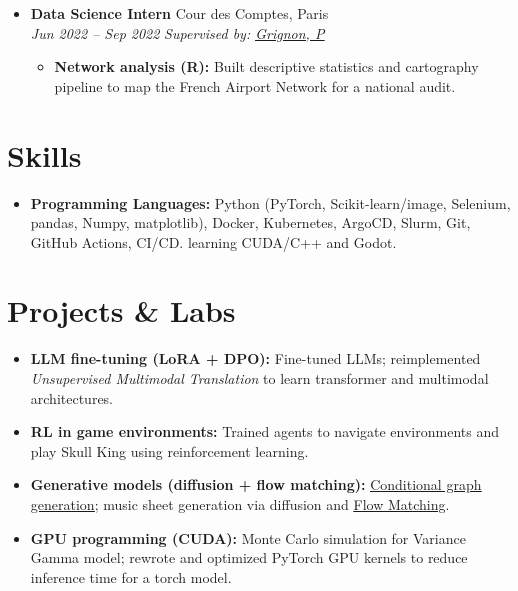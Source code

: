 \documentclass[letterpaper,11pt,twocolumn]{article}
\newcommand{\resumeItem}[1]{\item \small{#1}}
\newcommand{\resumeSubheading}[4]{
	\vspace{-2pt}\item \textbf{#1} \hfill #2 \\
	\textit{\small #3} \hfill \textit{\small #4} 
	\vspace{-7pt}
}
\newcommand{\resumeItemListStart}{\begin{itemize}[leftmargin=*]}
\newcommand{\resumeItemListEnd}{\end{itemize}\vspace{-5pt}}
\begin{document}
\begin{itemize}[leftmargin=*]
	\resumeItemListStart
	\resumeItem{\textbf{3D liver vessel segmentation (deep learning):} Implemented topology-preserving losses to improve segmentation accuracy; analyzed vessel tree morphometry. Published at MICCAI ADSMI 2024 (\underline{\href{https://gitlab.inria.fr/simbiotx/LiverVesselSeg}{Code}}).}
	\resumeItemListEnd
	
	\resumeSubheading
	{Data Science Intern}{Cour des Comptes, Paris}{Jun 2022 -- Sep 2022}{\textit{Supervised by: \href{https://fr.linkedin.com/in/paulgrignon}{\underline{Grignon, P}}}}
	
	\resumeItemListStart
	\resumeItem{\textbf{Network analysis (R):} Built descriptive statistics and cartography pipeline to map the French Airport Network for a national audit.}
	\resumeItemListEnd
\end{itemize}

\section{Skills}
\begin{itemize}[leftmargin=*]
	\item \textbf{Programming Languages:} Python (PyTorch, Scikit-learn/image, Selenium, pandas, Numpy, matplotlib), Docker, Kubernetes, ArgoCD, Slurm, Git, GitHub Actions, CI/CD. learning CUDA/C++ and Godot.
\end{itemize}

\section{Projects \& Labs}
\begin{itemize}[leftmargin=*]
	\resumeItem{\textbf{LLM fine-tuning (LoRA + DPO):} Fine-tuned LLMs; reimplemented \textit{Unsupervised Multimodal Translation} to learn transformer and multimodal architectures.}
	\resumeItem{\textbf{RL in game environments:} Trained agents to navigate environments and play Skull King using reinforcement learning.}
	\resumeItem{\textbf{Generative models (diffusion + flow matching):} \underline{\href{https://github.com/MachtaYassine/GGSP-ALTEGRAD/tree/main}{Conditional graph generation}}; music sheet generation via diffusion and \underline{\href{https://colab.research.google.com/drive/1HT1E62hvaACGgLNt3xu5m51AO4m_fTxO}{Flow Matching}}.}
	\resumeItem{\textbf{GPU programming (CUDA):} Monte Carlo simulation for Variance Gamma model; rewrote and optimized PyTorch GPU kernels to reduce inference time for a torch model.}
\end{itemize}
\end{document}
